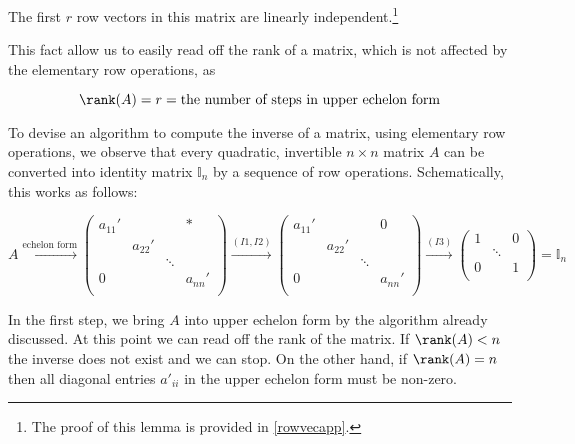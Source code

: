 \documentclass[a4paper,12pt]{report}
\begin{document}
\begin{lemma} \label{rowvec} 
The first \(r\) row vectors in this matrix are linearly independent.\footnote{The proof of this lemma is provided in \cref{rowvecapp}.}
\end{lemma}



This fact allow us to easily read off the rank of a matrix, which is not affected by the elementary row operations, as

\begin{equation}
    \rank (A) = r = \text{the number of steps in upper echelon form}
\end{equation}

To devise an algorithm to compute the inverse of a matrix, using elementary row operations, we observe that every quadratic, invertible \(n \times n\) matrix \(A\) can be converted into identity matrix \(\mathbb{I}_{n} \) by a sequence of row operations. Schematically, this works as follows:

\begin{equation}
    A \xrightarrow{\text{echelon form} } \begin{pmatrix}
        a_{11}'  &  &  & * \\
         & a_{22}'  &  &   \\
         &  & \ddots  &   \\
        0 &  &  & a_{nn}'   \\
    \end{pmatrix} \xrightarrow{(I1,I2)}  \begin{pmatrix}
        a_{11}'  &  &  & 0 \\
         & a_{22}'  &  &   \\
         &  & \ddots  &   \\
        0 &  &  & a_{nn}'   \\
    \end{pmatrix} \xrightarrow{(I3)} \begin{pmatrix}
        1 &  & 0  \\
         & \ddots  &   \\
        0 &  & 1 \\
    \end{pmatrix} = \mathbb{I}_{n} 
\end{equation}

In the first step, we bring \(A\) into upper echelon form by the algorithm already discussed. At this point we can read off the rank of the matrix. If \(\rank (A)<n\) the inverse does not exist and we can stop. On the other hand, if \(\rank (A) = n\) then all diagonal entries \(a'_{ii} \) in the upper echelon form must be non-zero.
\end{document}

